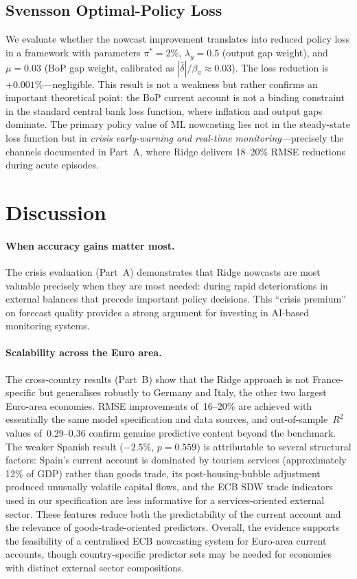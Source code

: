 \subsection{Svensson Optimal-Policy Loss}

We evaluate whether the nowcast improvement translates into reduced policy loss in a \citet{svensson2003wrong} framework with parameters $\pi^* = 2\%$, $\lambda_y = 0.5$ (output gap weight), and $\mu = 0.03$ (BoP gap weight, calibrated as $|\hat{\delta}|/\beta_\pi \approx 0.03$).  The loss reduction is~$+0.001\%$---negligible.  This result is not a weakness but rather confirms an important theoretical point: the BoP current account is not a binding constraint in the standard central bank loss function, where inflation and output gaps dominate.  The primary policy value of ML nowcasting lies not in the steady-state loss function but in \emph{crisis early-warning and real-time monitoring}---precisely the channels documented in Part~A, where Ridge delivers 18--20\% RMSE reductions during acute episodes.


\section{Discussion}
\label{sec:ch3_discussion}

\paragraph{When accuracy gains matter most.}
The crisis evaluation (Part~A) demonstrates that Ridge nowcasts are most valuable precisely when they are most needed: during rapid deteriorations in external balances that precede important policy decisions.  This ``crisis premium'' on forecast quality provides a strong argument for investing in AI-based monitoring systems.

\paragraph{Scalability across the Euro area.}
The cross-country results (Part~B) show that the Ridge approach is not France-specific but generalises robustly to Germany and Italy, the other two largest Euro-area economies.  RMSE improvements of~16--20\% are achieved with essentially the same model specification and data sources, and out-of-sample~$R^2$ values of~0.29--0.36 confirm genuine predictive content beyond the benchmark.  The weaker Spanish result ($-2.5$\%, $p = 0.559$) is attributable to several structural factors: Spain's current account is dominated by tourism services (approximately 12\% of GDP) rather than goods trade, its post-housing-bubble adjustment produced unusually volatile capital flows, and the ECB SDW trade indicators used in our specification are less informative for a services-oriented external sector.  These features reduce both the predictability of the current account and the relevance of goods-trade-oriented predictors.  Overall, the evidence supports the feasibility of a centralised ECB nowcasting system for Euro-area current accounts, though country-specific predictor sets may be needed for economies with distinct external sector compositions.

